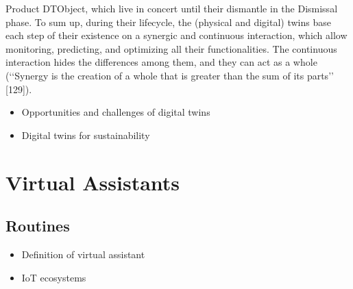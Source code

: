 Product DTObject, which live in concert until their dismantle in the Dismissal phase. To sum up, during their lifecycle, the (physical and digital) twins base each step of their existence on a synergic and continuous interaction, which allow monitoring, predicting, and optimizing all their functionalities. The continuous interaction hides the differences among them, and they can act as a whole (‘‘Synergy is the creation of a whole that is greater than the sum of its parts’’ [129]).

\begin{itemize}
    \item Opportunities and challenges of digital twins
    \item Digital twins for sustainability
\end{itemize}

\section{Virtual Assistants}

\subsection{Routines}

\begin{itemize}
    \item Definition of virtual assistant
    \item IoT ecosystems
\end{itemize}